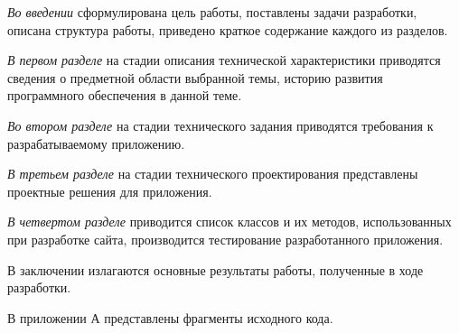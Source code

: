\emph{Во введении} сформулирована цель работы, поставлены задачи разработки, описана структура работы, приведено краткое содержание каждого из разделов.

\emph{В первом разделе} на стадии описания технической характеристики приводятся сведения о предметной области выбранной темы, историю развития программного обеспечения в данной теме.

\emph{Во втором разделе} на стадии технического задания приводятся требования к разрабатываемому приложению.

\emph{В третьем разделе} на стадии технического проектирования представлены проектные решения для приложения.

\emph{В четвертом разделе} приводится список классов и их методов, использованных при разработке сайта, производится тестирование разработанного приложения.

В заключении излагаются основные результаты работы, полученные в ходе разработки.

В приложении А представлены фрагменты исходного кода. 
